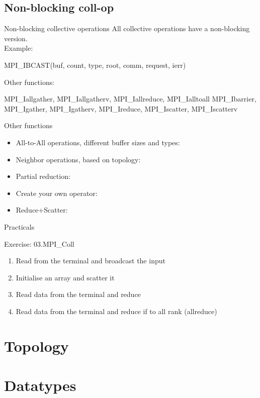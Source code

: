\documentclass[aspectratio=43]{beamer}
\begin{document}
\subsection{Non-blocking coll-op}
\begin{frame}[fragile]{Non-blocking collective operations}
All collective operations have a non-blocking version.\\
Example:
\begin{Fortranlisting}[]{}
MPI_IBCAST(buf, count, type, root, comm, request, ierr)
\end{Fortranlisting}
Other functions:\\
\begin{Fortranlisting}[]{}
MPI_Iallgather, MPI_Iallgatherv, MPI_Iallreduce, MPI_Ialltoall
MPI_Ibarrier, MPI_Igather, MPI_Igatherv, MPI_Ireduce, MPI_Iscatter, MPI_Iscatterv
\end{Fortranlisting}
\end{frame}

\begin{frame}[fragile]{Other functions}
\begin{itemize}
    \item All-to-All operations, different buffer sizes and types:\\\hspace{1cm}
    \item Neighbor operations, based on topology:\\\hspace{1cm}
    \item Partial reduction:\\\hspace{1cm}
    \item Create your own operator:\\\hspace{1cm}
    \item Reduce+Scatter:\\\hspace{1cm}
\end{itemize}
\end{frame}

\begin{frame}{Practicals}
    \begin{brown2block}{Exercise: 03.MPI\_Coll}
    \begin{enumerate}
        \item Read from the terminal and broadcast the input
        \item Initialise an array and scatter it
        \item Read data from the terminal and reduce
        \item Read data from the terminal and reduce if to all rank (allreduce)
    \end{enumerate}
    \end{brown2block}
\end{frame}

\section{Topology}
\section{Datatypes}

\end{document}
